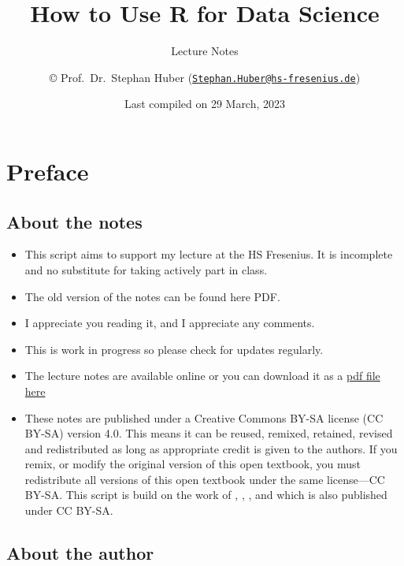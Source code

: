 \documentclass[
  12pt,
  oneside]{book}
\title{How to Use R for Data Science}
\subtitle{Lecture Notes}
\author{© Prof.~Dr.~Stephan Huber (\href{mailto:Stephan.Huber@hs-fresenius.de}{\nolinkurl{Stephan.Huber@hs-fresenius.de}})}
\date{Last compiled on 29 March, 2023}
\providecommand{\tightlist}{%
  \setlength{\itemsep}{0pt}\setlength{\parskip}{0pt}}
\begin{document}
\maketitle

{
\hypersetup{linkcolor=}
\setcounter{tocdepth}{2}
\tableofcontents
}
\hypertarget{preface}{%
\chapter*{Preface}\label{preface}}

\hypertarget{about-the-notes}{%
\section*{About the notes}\label{about-the-notes}}

\begin{itemize}
\tightlist
\item
  This script aims to support my lecture at the HS Fresenius. It is incomplete and no substitute for taking actively part in class.
\item
  The old version of the notes can be found here PDF.
\item
  I appreciate you reading it, and I appreciate any comments.
\item
  This is work in progress so please check for updates regularly.
\item
  The lecture notes are available online or you can download it as a \href{https://raw.githubusercontent.com/hubchev/hubchev.github.io/main/ds/_main.pdf}{pdf file here}
\item
  These notes are published under a Creative Commons BY-SA license (CC BY-SA) version 4.0. This means it can be reused, remixed, retained, revised and redistributed as long as appropriate credit is given to the authors. If you remix, or modify the original version of this open textbook, you must redistribute all versions of this open textbook under the same license---CC BY-SA. This script is build on the work of \citet{Navarro2020Learning}, \citet{Muschelli2022Introduction}, \citet{Thulin2021Modern}, and \citet{Ismay2022Statistical} which is also published under CC BY-SA.
\end{itemize}

\hypertarget{about-the-author}{%
\section*{About the author}\label{about-the-author}}
\end{document}
